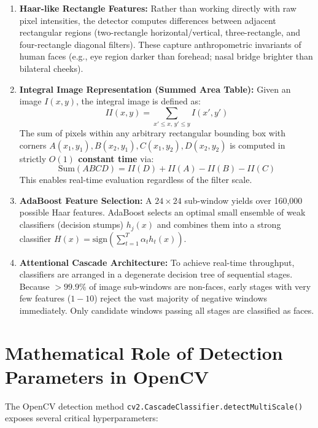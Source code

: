 \documentclass[12pt]{article}
\begin{document}
\begin{enumerate}
    \item \textbf{Haar-like Rectangle Features:} Rather than working directly with raw pixel intensities, the detector computes differences between adjacent rectangular regions (two-rectangle horizontal/vertical, three-rectangle, and four-rectangle diagonal filters). These capture anthropometric invariants of human faces (e.g., eye region darker than forehead; nasal bridge brighter than bilateral cheeks).
    
    \item \textbf{Integral Image Representation (Summed Area Table):} Given an image $I(x,y)$, the integral image is defined as:
    \begin{equation}
        II(x,y) = \sum_{x' \le x, \, y' \le y} I(x',y')
    \end{equation}
    The sum of pixels within any arbitrary rectangular bounding box with corners $A(x_1, y_1), B(x_2, y_1), C(x_1, y_2), D(x_2, y_2)$ is computed in strictly \textbf{$O(1)$ constant time} via:
    \begin{equation}
        \text{Sum}(ABCD) = II(D) + II(A) - II(B) - II(C)
    \end{equation}
    This enables real-time evaluation regardless of the filter scale.
    
    \item \textbf{AdaBoost Feature Selection:} A $24 \times 24$ sub-window yields over 160,000 possible Haar features. AdaBoost selects an optimal small ensemble of weak classifiers (decision stumps) $h_j(x)$ and combines them into a strong classifier $H(x) = \text{sign}\left(\sum_{t=1}^T \alpha_t h_t(x)\right)$.
    
    \item \textbf{Attentional Cascade Architecture:} To achieve real-time throughput, classifiers are arranged in a degenerate decision tree of sequential stages. Because $>99.9\%$ of image sub-windows are non-faces, early stages with very few features ($1-10$) reject the vast majority of negative windows immediately. Only candidate windows passing all stages are classified as faces.
\end{enumerate}

\section{Mathematical Role of Detection Parameters in OpenCV}

The OpenCV detection method \texttt{cv2.CascadeClassifier.detectMultiScale()} exposes several critical hyperparameters:
\end{document}
